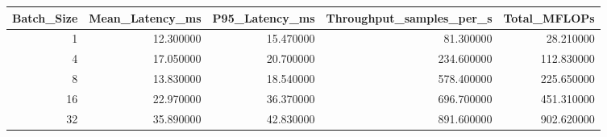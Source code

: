 \begin{tabular}{rrrrr}
\toprule
Batch_Size & Mean_Latency_ms & P95_Latency_ms & Throughput_samples_per_s & Total_MFLOPs \\
\midrule
1 & 12.300000 & 15.470000 & 81.300000 & 28.210000 \\
4 & 17.050000 & 20.700000 & 234.600000 & 112.830000 \\
8 & 13.830000 & 18.540000 & 578.400000 & 225.650000 \\
16 & 22.970000 & 36.370000 & 696.700000 & 451.310000 \\
32 & 35.890000 & 42.830000 & 891.600000 & 902.620000 \\
\bottomrule
\end{tabular}
